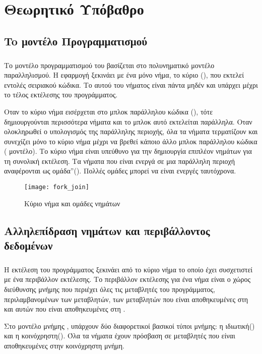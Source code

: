 \section{Θεωρητικό Υπόβαθρο}
\subsection{To μοντέλο Προγραμματισμού }
\subparagraph{}
Το μοντέλο προγραμματισμού του  βασίζεται στο πολυνηματικό μοντέλο παραλληλισμού.  Η εφαρμογή ξεκινάει με ένα μόνο νήμα, το κύριο (), που εκτελεί εντολές σειριακού κώδικα. Το  αυτού του νήματος είναι πάντα μηδέν και υπάρχει μέχρι το τέλος εκτέλεσης του προγράμματος\cite{pdplab}. 

Οταν το κύριο νήμα  εισέρχεται στο μπλοκ παράλληλου κώδικα (), τότε δημιουργούνται περισσότερα νήματα και το μπλοκ αυτό εκτελείται παράλληλα. Οταν ολοκληρωθεί ο υπολογισμός της παράλληλης περιοχής, όλα τα νήματα τερματίζουν και συνεχίζει μόνο το κύριο νήμα μέχρι να βρεθεί κάποιο άλλο μπλοκ παράλληλου κώδικα ( μοντέλο)\cite{pdplab}. Το κύριο νήμα είναι υπεύθυνο για την δημιουργία επιπλέον νημάτων για τη συνολική εκτέλεση. Τα νήματα που είναι ενεργά σε μια παράλληλη περιοχή αναφέρονται ως ομάδα”(). Πολλές ομάδες μπορεί να είναι ενεργές ταυτόχρονα\cite{ompblaise}.

\begin{figure}[h]
\texttt{[image: fork\_join]}
\captionsetup{justification=centering, singlelinecheck=false}
\caption{Κύριο νήμα και ομάδες νημάτων}
\label{fig:fork_join}
\end{figure}

\clearpage
\subsection{Αλληλεπίδραση νημάτων και περιβάλλοντος δεδομένων}
\subparagraph{}
Η εκτέλεση του προγράμματος ξεκινάει από το κύριο νήμα το οποίο έχει συσχετιστεί με ένα περιβάλλον εκτέλεσης. Το περιβάλλον εκτέλεσης για ένα νήμα είναι ο χώρος διεύθυνσης μνήμης που περιέχει όλες τις μεταβλητές του προγράμματος, περιλαμβανομένων των  μεταβλητών, των μεταβλητών που είναι αποθηκευμένες στη  και αυτών που είναι αποθηκευμένες στη \cite{book2}. 

Στο μοντέλο μνήμης , υπάρχουν δύο διαφορετικοί βασικοί τύποι μνήμης: η ιδιωτική() και η κοινόχρηστη().  Όλα τα νήματα έχουν πρόσβαση σε μεταβλητές που είναι αποθηκευμένες στην κοινόχρηστη μνήμη\cite{thenextstep7}.

